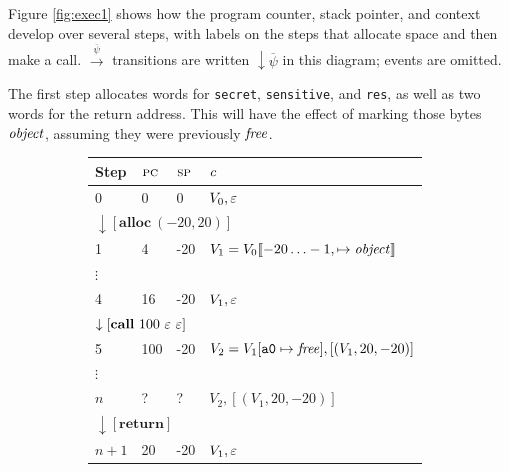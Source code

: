 \documentclass[10pt,conference]{ieeetran}%
\theoremstyle{definition}
\begin{document}

Figure \ref{fig:exec1} shows how the program counter, stack pointer, and context
develop over several steps, with labels on the steps that allocate space and then make
a call. \(\xrightarrow{\overline{\psi}}\) transitions are written \(\downarrow \overline{\psi}\) in this diagram;
events are omitted.

The first step  allocates words for {\tt secret}, {\tt sensitive}, and {\tt res}, as well
as two words for the return address. This will have the
effect of marking those bytes \(\mathit{object}\), assuming they were previously
\(\mathit{free}\).

\begin{figure}
  \begin{subfigure}[t]{.5\textwidth}
    \vskip 0pt
    \begin{tabular}{| l | l | l || l |}
      \hline
      Step & \(\textsc{pc}\) & \(\textsc{sp}\) & \(\mathit{c}\) \\
      \hline
      0 & 0 & 0 & \(V_0, \varepsilon\) \\
      \hline
      \multicolumn{4}{l}{\(\downarrow [\mathbf{alloc} ~ (-20,20)]\)} \\
      \hline
      1 & 4 & -20 & \(V_1 = V_0 \llbracket -20 \ldots -1, \mapsto \mathit{object} \rrbracket\) \\
      \hline
      \multicolumn{4}{l}{\(\vdots\)} \\
      \hline
      4 & 16 & -20 & \(V_1, \varepsilon\) \\
      \hline
      \multicolumn{4}{l}{\(\downarrow [\mathbf{call} ~ 100 ~ \varepsilon ~ \varepsilon]\)} \\
      \hline
      5 & 100 & -20 & \(V_2 = V_1 [\mathtt{a0} \mapsto \mathit{free}],[(V_1, 20, -20)]\) \\
      \hline
      \multicolumn{4}{l}{\(\vdots\)} \\
      \hline
      \(n\) & ? & ? & \(V_2,[(V_1, 20, -20)]\) \\
      \hline
      \multicolumn{4}{l}{\(\downarrow [\mathbf{return}]\)} \\
      \hline
      \(n+1\) & 20 & -20 & \(V_1, \varepsilon\) \\
      \hline
    \end{tabular}
  \end{subfigure}
  \begin{subfigure}[t]{.4\textwidth}

\end{subfigure}
\end{figure}
\end{document}
